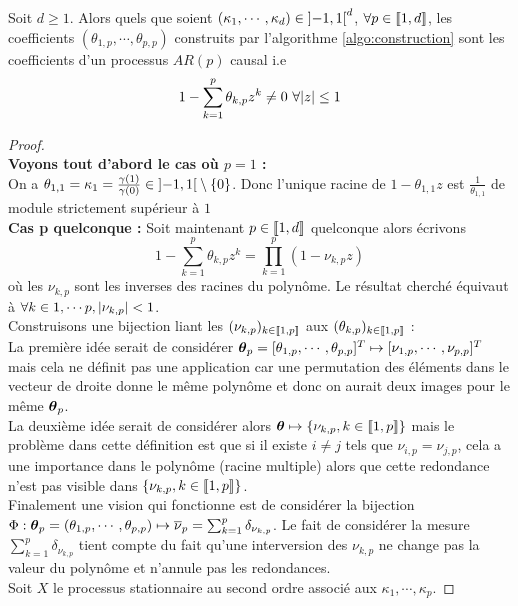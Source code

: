 \documentclass{report}
\begin{document}
\begin{Thm}
\label{thm:kappa}
Soit $d \geq 1$. Alors quels que soient $(\kappa_1,\cdots, \kappa_d)\in {\left] -1,1 \right[}^d$, $\forall p \in {\left\llbracket 1,d \right\rrbracket}$, les coefficients $(\theta_{1,p}, \cdots, \theta_{p,p})$ construits par l'algorithme \ref{algo:construction} sont les coefficients d'un processus $AR(p)$ causal i.e 
$$
1-\sum_{k=1}^p \theta_{k,p} z^k \neq 0 \,\, \forall { \left| z \right|} \leq 1
$$
\end{Thm}
\begin{proof}~\\
\textbf{Voyons tout d'abord le cas où $p=1$ :} \\
On a $\theta_{1,1} = \kappa_1 = \frac{\gamma(1)}{\gamma(0)} \in {\left] -1,1 \right[} \setminus { \left\lbrace 0 \right\rbrace }$. Donc l'unique racine de $1-\theta_{1,1}z$ est $\frac{1}{\theta_{1,1}}$ de module strictement supérieur à $1$ \\
\textbf{Cas p quelconque :} Soit maintenant $p \in {\left\llbracket 1,d \right\rrbracket}$ quelconque alors écrivons 
$$
1- \sum_{k=1}^p \theta_{k,p} z^k = \prod_{k=1}^p (1-\nu_{k,p} z)
$$
où les $\nu_{k,p}$ sont les inverses des racines du polynôme. Le résultat cherché équivaut à $\forall k\in {1,\cdots p}, { \left| \nu_{k,p} \right|} < 1$. \\
Construisons une bijection liant les $(\nu_{k,p})_{k\in {\left\llbracket 1,p \right\rrbracket}}$ aux $(\theta_{k,p})_{k\in {\left\llbracket 1,p \right\rrbracket}}$ : \\
La première idée serait de considérer $\boldsymbol{\theta}_p=[\theta_{1,p},\cdots,\theta_{p,p}]^T \mapsto [\nu_{1,p},\cdots,\nu_{p,p}]^T$ mais cela ne définit pas une application car une permutation des éléments dans le vecteur de droite donne le même polynôme et donc on aurait deux images pour le même $\boldsymbol{\theta}_p$. \\
La deuxième idée serait de considérer alors $\boldsymbol{\theta} \mapsto { \left\lbrace  \nu_{k,p}, k\in {\left\llbracket 1,p \right\rrbracket} \right\rbrace }$ mais le problème dans cette définition est que si il existe $i \neq j$ tels que $\nu_{i,p}=\nu_{j,p}$, cela a une importance dans le polynôme (racine multiple) alors que cette redondance n'est pas visible dans ${ \left\lbrace  \nu_{k,p}, k\in {\left\llbracket 1,p \right\rrbracket} \right\rbrace }$. \\
Finalement une vision qui fonctionne est de considérer la bijection $\Phi : \boldsymbol{\theta}_p = (\theta_{1,p}, \cdots, \theta_{p,p}) \mapsto \overline{\nu}_p = \sum_{k=1}^p \delta_{\nu_{k,p}}$. Le fait de considérer la mesure $\sum_{k=1}^p \delta_{\nu_{k,p}}$ tient compte du fait qu'une interversion des $\nu_{k,p}$ ne change pas la valeur du polynôme et n'annule pas les redondances. \\
Soit $X$ le processus stationnaire au second ordre associé aux $\kappa_1,\cdots,\kappa_p$.

\end{proof}
\end{document}
